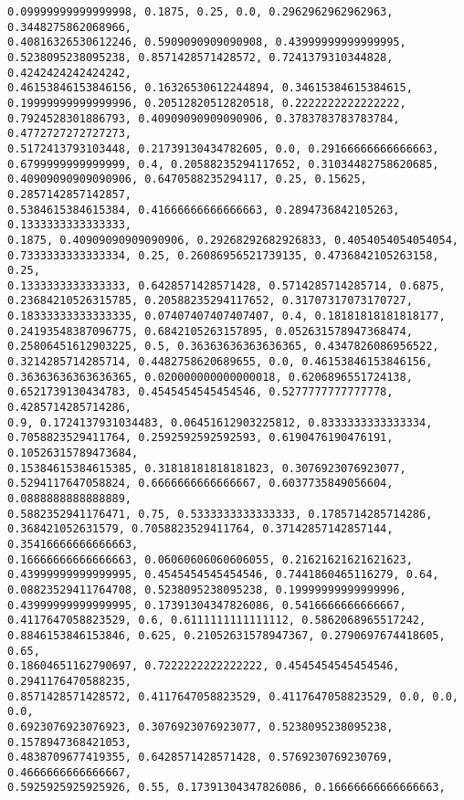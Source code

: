 \documentclass[11pt]{article}
\begin{document}
\begin{Verbatim}[commandchars=\\\{\}]
0.09999999999999998, 0.1875, 0.25, 0.0, 0.2962962962962963, 0.3448275862068966,
0.40816326530612246, 0.5909090909090908, 0.43999999999999995,
0.5238095238095238, 0.8571428571428572, 0.7241379310344828, 0.4242424242424242,
0.46153846153846156, 0.16326530612244894, 0.34615384615384615,
0.19999999999999996, 0.20512820512820518, 0.2222222222222222,
0.7924528301886793, 0.40909090909090906, 0.3783783783783784, 0.4772727272727273,
0.5172413793103448, 0.21739130434782605, 0.0, 0.29166666666666663,
0.6799999999999999, 0.4, 0.20588235294117652, 0.31034482758620685,
0.40909090909090906, 0.6470588235294117, 0.25, 0.15625, 0.2857142857142857,
0.5384615384615384, 0.41666666666666663, 0.2894736842105263, 0.1333333333333333,
0.1875, 0.40909090909090906, 0.29268292682926833, 0.4054054054054054,
0.7333333333333334, 0.25, 0.26086956521739135, 0.4736842105263158, 0.25,
0.1333333333333333, 0.6428571428571428, 0.5714285714285714, 0.6875,
0.23684210526315785, 0.20588235294117652, 0.31707317073170727,
0.18333333333333335, 0.07407407407407407, 0.4, 0.18181818181818177,
0.24193548387096775, 0.6842105263157895, 0.052631578947368474,
0.25806451612903225, 0.5, 0.36363636363636365, 0.4347826086956522,
0.3214285714285714, 0.4482758620689655, 0.0, 0.46153846153846156,
0.36363636363636365, 0.020000000000000018, 0.6206896551724138,
0.6521739130434783, 0.4545454545454546, 0.5277777777777778, 0.4285714285714286,
0.9, 0.1724137931034483, 0.06451612903225812, 0.8333333333333334,
0.7058823529411764, 0.2592592592592593, 0.6190476190476191, 0.10526315789473684,
0.15384615384615385, 0.31818181818181823, 0.3076923076923077,
0.5294117647058824, 0.6666666666666667, 0.6037735849056604, 0.0888888888888889,
0.5882352941176471, 0.75, 0.5333333333333333, 0.1785714285714286,
0.368421052631579, 0.7058823529411764, 0.37142857142857144, 0.35416666666666663,
0.16666666666666663, 0.06060606060606055, 0.21621621621621623,
0.43999999999999995, 0.4545454545454546, 0.7441860465116279, 0.64,
0.08823529411764708, 0.5238095238095238, 0.19999999999999996,
0.43999999999999995, 0.17391304347826086, 0.5416666666666667,
0.4117647058823529, 0.6, 0.6111111111111112, 0.5862068965517242,
0.8846153846153846, 0.625, 0.21052631578947367, 0.2790697674418605, 0.65,
0.18604651162790697, 0.7222222222222222, 0.4545454545454546, 0.2941176470588235,
0.8571428571428572, 0.4117647058823529, 0.4117647058823529, 0.0, 0.0, 0.0,
0.6923076923076923, 0.3076923076923077, 0.5238095238095238, 0.1578947368421053,
0.4838709677419355, 0.6428571428571428, 0.5769230769230769, 0.4666666666666667,
0.5925925925925926, 0.55, 0.17391304347826086, 0.16666666666666663,

\end{Verbatim}
\end{document}

